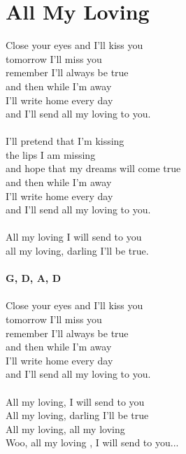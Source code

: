 \section{All My Loving}
Close your eyes and I'll kiss you\\
tomorrow I'll miss you\\
remember I'll always be true\\
and then while I'm away\\
I'll write home every day\\
and I'll send all my loving to you.\\
\\
I'll pretend that I'm kissing\\
the lips I am missing\\
and hope that my dreams will come true\\
and then while I'm away\\
I'll write home every day\\
and I'll send all my loving to you.\\
\\
All my loving I will send to you\\
all my loving, darling I'll be true.\\
\\
\footnotesize\textbf{G, D, A\7, D}\\
\normalsize
\\
Close your eyes and I'll kiss you\\
tomorrow I'll miss you\\
remember I'll always be true\\
and then while I'm away\\
I'll write home every day\\
and I'll send all my loving to you.\\
\\
All my loving, I will send to you\\
All my loving, darling I'll be true\\
All my loving, all my loving\\
Woo, all my loving , I will send to you...\\